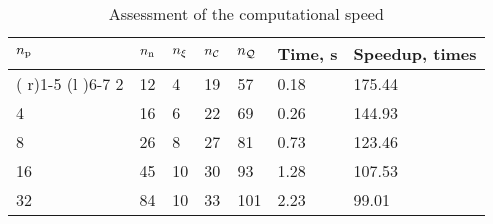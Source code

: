 \begin{table}[t]
  \centering
  \caption{Assessment of the computational speed}
  \vspace{-0.5em}
  \begin{tabular*}{1\linewidth}{R{10pt}R{16pt}R{16pt}R{16pt}R{16pt}R{44pt}R{49pt}}
    \toprule
    ${n_\text{p}}$ & ${n_\text{n}}$ & ${n_\xi}$ & ${n_\mathcal{C}}$ & ${n_\mathcal{Q}}$ & Time, s & Speedup, times \\
    \cmidrule( r){1-5}
    \cmidrule(l ){6-7}
     2 & 12 &  4 & 19 &  57 & 0.18 & 175.44 \\
     4 & 16 &  6 & 22 &  69 & 0.26 & 144.93 \\
     8 & 26 &  8 & 27 &  81 & 0.73 & 123.46 \\
    16 & 45 & 10 & 30 &  93 & 1.28 & 107.53 \\
    32 & 84 & 10 & 33 & 101 & 2.23 &  99.01 \\
    \bottomrule
  \end{tabular*}
\end{table}
